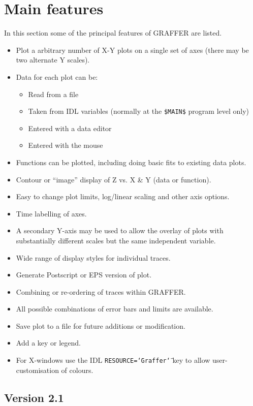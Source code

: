 \documentclass[11pt,twoside,english]{article}
\begin{document}
\section{Main features}

In this section some of the principal features of GRAFFER are listed.

\begin{itemize}
\item Plot a arbitrary number of X-Y plots on a single set of axes
  (there may be two alternate Y scales).
\item Data for each plot can be:
  \begin{itemize}
  \item Read from a file
  \item Taken from IDL variables (normally at the \texttt{\$MAIN\$} program
    level only)
  \item Entered with a data editor
  \item Entered with the mouse
  \end{itemize}
\item Functions can be plotted, including doing basic fits to existing
  data plots.
\item Contour or ``image'' display of Z vs. X \& Y (data or function).
\item Easy to change plot limits, log/linear scaling and other axis
  options.
\item Time labelling of axes.
\item A secondary Y-axis may be used to allow the overlay of plots with
  substantially different scales but the same independent variable.
\item Wide range of display styles for individual traces.
\item Generate Postscript or EPS version of plot.
\item Combining or re-ordering of traces within GRAFFER.
\item All possible combinations of error bars and limits are available.
\item Save plot to a file for future additions or modification.
\item Add a key or legend.
\item For X-windows use the IDL
  \texttt{RESOURCE=\char`\"{}Graffer\char`\"{}} key to allow
  user-customisation of colours.
\end{itemize}

\subsection{Version 2.1}
\end{document}
